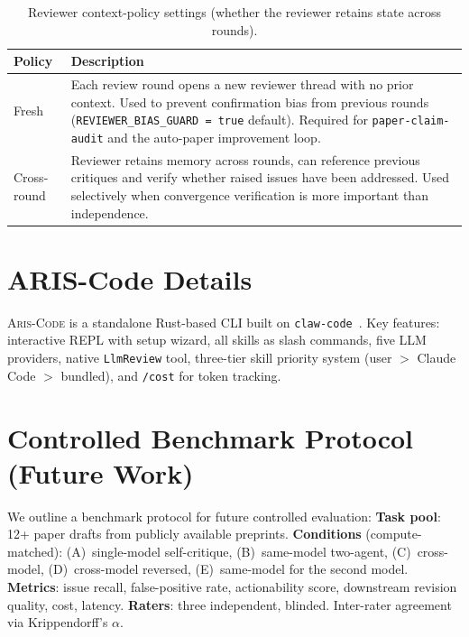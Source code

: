 \documentclass{article}
\newcommand{\ariscode}{\textsc{Aris-Code}}
\theoremstyle{remark}
\begin{document}
\begin{table}[h]
\centering
\caption{Reviewer context-policy settings (whether the reviewer retains state across rounds).}
\label{tab:context}
\small
\begin{tabular}{@{}lp{8cm}@{}}
\toprule
\textbf{Policy} & \textbf{Description} \\
\midrule
Fresh & Each review round opens a new reviewer thread with no prior context. Used to prevent confirmation bias from previous rounds (\texttt{REVIEWER\_BIAS\_GUARD = true} default). Required for \texttt{paper-claim-audit} and the auto-paper improvement loop. \\
Cross-round & Reviewer retains memory across rounds, can reference previous critiques and verify whether raised issues have been addressed. Used selectively when convergence verification is more important than independence. \\
\bottomrule
\end{tabular}
\end{table}

\section{ARIS-Code Details}
\label{app:ariscode}

\ariscode{} is a standalone Rust-based CLI built on \texttt{claw-code}~\citep{ultraworkers2025}.
Key features: interactive REPL with setup wizard, all skills as slash commands, five LLM providers, native \texttt{LlmReview} tool, three-tier skill priority system (user $>$ Claude Code $>$ bundled), and \texttt{/cost} for token tracking.

\section{Controlled Benchmark Protocol (Future Work)}
\label{app:benchmark}

We outline a benchmark protocol for future controlled evaluation:
\textbf{Task pool}: 12+ paper drafts from publicly available preprints.
\textbf{Conditions} (compute-matched): (A)~single-model self-critique, (B)~same-model two-agent, (C)~cross-model, (D)~cross-model reversed, (E)~same-model for the second model.
\textbf{Metrics}: issue recall, false-positive rate, actionability score, downstream revision quality, cost, latency.
\textbf{Raters}: three independent, blinded. Inter-rater agreement via Krippendorff's $\alpha$.
 
\end{document}
